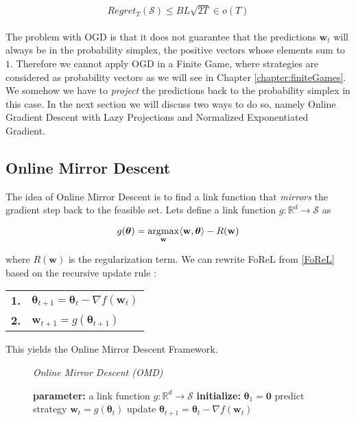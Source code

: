 \begin{equation}\label{EuclideanNoRegret}
    Regret_T(\mathcal{S}) \le BL\sqrt{2T} \in o(T)
\end{equation} \\

The problem with OGD is that it does not guarantee that the predictions $\textbf{w}_t$ will always be in the probability simplex, the positive vectors whose elements sum to $1$. Therefore we cannot apply OGD in a Finite Game, where strategies are considered as probability vectors as we will see in Chapter \ref{chapter:finiteGames}. We somehow we have to \textit{project} the predictions back to the probability simplex in this case. In the next section we will discuss two ways to do so, namely Online Gradient Descent with Lazy Projections and Normalized Exponentiated Gradient. 


\subsection{Online Mirror Descent}\label{subsection:onlineMirrorAscent}

The idea of Online Mirror Descent is to find a link function that \textit{mirrors} the gradient step back to the feasible set. Lets define a link function $g: \mathbb{R}^d \to \mathcal{S}$ as 

\begin{equation}\label{link}
    g(\boldsymbol{\theta}) = \operatorname*{\arg\!\max}_{\textbf{w}} \langle\textbf{w},\boldsymbol{\theta}\rangle - R(\textbf{w})
\end{equation}

where $R(\textbf{w})$ is the regularization term. We can rewrite FoReL from \ref{FoReL} based on the recursive update rule \cite{shalev}: \\

\begin{center}
    \begin{tabular}{ll}
    \textbf{1.} & $\boldsymbol{\theta}_{t+1} = \boldsymbol{\theta}_t - \nabla f(\textbf{w}_t)$\\
    \textbf{2.} & $\textbf{w}_{t+1} = g(\boldsymbol{\theta}_{t+1})$\\
    \end{tabular} 
\end{center}

This yields the Online Mirror Descent Framework. 

\begin{figure}[H]\centering
    \textit{Online Mirror Descent (OMD)}
    \begin{minipage}{.7\linewidth}
        \begin{algorithm}[H]
        \DontPrintSemicolon
        \textbf{parameter: } a link function $g: \mathbb{R}^d \to \mathcal{S}$ \;
        \textbf{initialize: } $\boldsymbol{\theta}_1 = \textbf{0}$ \;
         {
        predict strategy $\textbf{w}_t = g(\boldsymbol{\theta}_t)$ \;
        update $\boldsymbol{\theta}_{t+1} = \boldsymbol{\theta}_t - \nabla f(\textbf{w}_t)$ \;
        }
        \end{algorithm}\caption*{}
  \end{minipage}
\end{figure}

